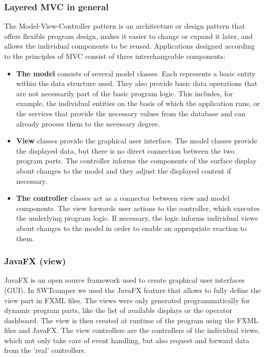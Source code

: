 \subsubsection{Layered MVC in general}
The Model-View-Controller pattern is an architecture or design pattern that offers flexible program design, makes it easier to change or expand it later, and allows the individual components to be reused.
Applications designed according to the principles of MVC consist of three interchangeable components:

\begin{itemize}
	\item \textbf{The model} consists of several model classes. Each represents a basic entity within the data structure used. They also provide basic data operations that are not necessarily part of the basic program logic. This includes, for example, the individual entities on the basis of which the application runs, or the services that provide the necessary values from the database and can already process them to the necessary degree.
	
	\item \textbf{View} classes provide the graphical user interface. The model classes provide the displayed data, but there is no direct connection between the two program parts. The controller informs the components of the surface display about changes to the model and they adjust the displayed content if necessary.
	
	\item \textbf{The controller} classes act as a connector between view and model components. The view forwards user actions to the controller, which executes the underlying program logic. If necessary, the logic informs individual views about changes to the model in order to enable an appropriate reaction to them.
\end{itemize}

\subsubsection{JavaFX (view)}
JavaFX is an open source framework used to create graphical user interfaces (GUI). In SWTcamper we used the JavaFX feature that allows to fully define the view part in FXML files. The views were only generated programmatically for dynamic program parts, like the list of available displays or the operator dashboard. The view is then created at runtime of the program using the FXML files and JavaFX. The view controllers are the controllers of the individual views, which not only take care of event handling, but also request and forward data from the 'real' controllers.

